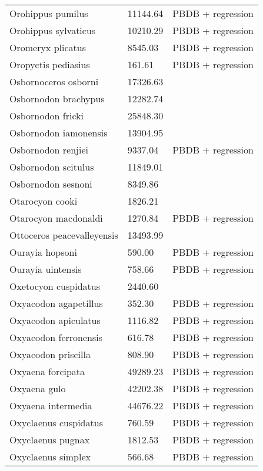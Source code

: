 \documentclass{article}
\begin{document}
\begin{center}
\begin{longtable}{p{} p{} p{}}
    Orohippus pumilus & 11144.64 & PBDB + regression \\ 
    Orohippus sylvaticus & 10210.29 & PBDB + regression \\ 
    Oromeryx plicatus & 8545.03 & PBDB + regression \\ 
    Oropyctis pediasius & 161.61 & PBDB + regression \\ 
    Osbornoceros osborni & 17326.63 & \cite{Tomiya2013} \\ 
    Osbornodon brachypus & 12282.74 & \cite{Chester2012} \\ 
    Osbornodon fricki & 25848.30 & \cite{Tomiya2013} \\ 
    Osbornodon iamonensis & 13904.95 & \cite{Tomiya2013} \\ 
    Osbornodon renjiei & 9337.04 & PBDB + regression \\ 
    Osbornodon scitulus & 11849.01 & \cite{Tomiya2013} \\ 
    Osbornodon sesnoni & 8349.86 & \cite{Tomiya2013} \\ 
    Otarocyon cooki & 1826.21 & \cite{Tomiya2013} \\ 
    Otarocyon macdonaldi & 1270.84 & PBDB + regression \\ 
    Ottoceros peacevalleyensis & 13493.99 & \cite{Tomiya2013} \\ 
    Ourayia hopsoni & 590.00 & PBDB + regression \\ 
    Ourayia uintensis & 758.66 & PBDB + regression \\ 
    Oxetocyon cuspidatus & 2440.60 & \cite{Tomiya2013} \\ 
    Oxyacodon agapetillus & 352.30 & PBDB + regression \\ 
    Oxyacodon apiculatus & 1116.82 & PBDB + regression \\ 
    Oxyacodon ferronensis & 616.78 & PBDB + regression \\ 
    Oxyacodon priscilla & 808.90 & PBDB + regression \\ 
    Oxyaena forcipata & 49289.23 & PBDB + regression \\ 
    Oxyaena gulo & 42202.38 & PBDB + regression \\ 
    Oxyaena intermedia & 44676.22 & PBDB + regression \\ 
    Oxyclaenus cuspidatus & 760.59 & PBDB + regression \\ 
    Oxyclaenus pugnax & 1812.53 & PBDB + regression \\ 
    Oxyclaenus simplex & 566.68 & PBDB + regression \\ 

\end{longtable}
\end{center}
\end{document}
